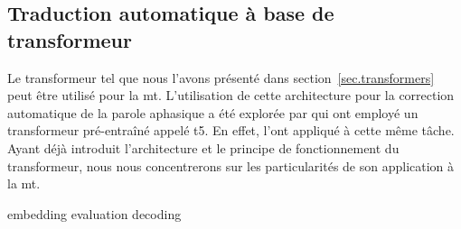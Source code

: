 \subsection{Traduction automatique à base de transformeur}
\label{subsec.nmt-transformer}

Le transformeur tel que nous l'avons présenté dans section~\ref{sec.transformers}
peut être utilisé pour la \gls{mt}.
L'utilisation de cette architecture pour la correction automatique de la parole aphasique
a été explorée par \cite{Misra_Mishra_Gandhi_2022} qui ont employé un transformeur pré-entraîné
appelé \gls{t5}.
En effet, \cite{attention} l'ont appliqué à cette même tâche.
Ayant déjà introduit l'architecture et le principe de fonctionnement du transformeur,
nous nous concentrerons sur les particularités de son application à la \gls{mt}.

{embedding}
{evaluation}
{decoding}